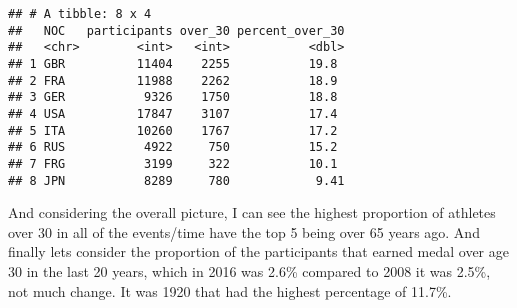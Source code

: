 \documentclass[]{article}
\newenvironment{Shaded}{\begin{snugshade}}{\end{snugshade}}
\newcommand{\KeywordTok}[1]{\textcolor[rgb]{0.13,0.29,0.53}{\textbf{#1}}}
\newcommand{\DataTypeTok}[1]{\textcolor[rgb]{0.13,0.29,0.53}{#1}}
\newcommand{\DecValTok}[1]{\textcolor[rgb]{0.00,0.00,0.81}{#1}}
\newcommand{\StringTok}[1]{\textcolor[rgb]{0.31,0.60,0.02}{#1}}
\newcommand{\OperatorTok}[1]{\textcolor[rgb]{0.81,0.36,0.00}{\textbf{#1}}}
\newcommand{\NormalTok}[1]{#1}
\begin{document}
\begin{Shaded}
\end{Shaded}

\begin{verbatim}
## # A tibble: 8 x 4
##   NOC   participants over_30 percent_over_30
##   <chr>        <int>   <int>           <dbl>
## 1 GBR          11404    2255           19.8 
## 2 FRA          11988    2262           18.9 
## 3 GER           9326    1750           18.8 
## 4 USA          17847    3107           17.4 
## 5 ITA          10260    1767           17.2 
## 6 RUS           4922     750           15.2 
## 7 FRG           3199     322           10.1 
## 8 JPN           8289     780            9.41
\end{verbatim}

And considering the overall picture, I can see the highest proportion of
athletes over 30 in all of the events/time have the top 5 being over 65
years ago. And finally lets consider the proportion of the participants
that earned medal over age 30 in the last 20 years, which in 2016 was
2.6\% compared to 2008 it was 2.5\%, not much change. It was 1920 that
had the highest percentage of 11.7\%.

\begin{Shaded}
\end{Shaded}
\end{document}
